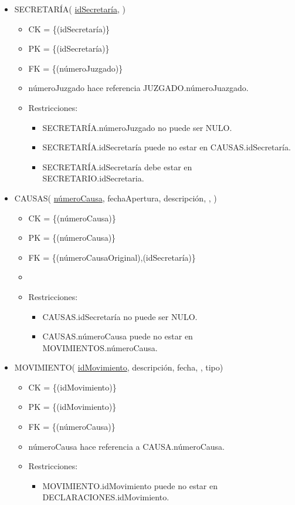 \begin{itemize}
\item SECRETARÍA( \underline{idSecretaría}, )
	\begin{itemize}
		\item CK = \{(idSecretaría)\}
		\item PK = \{(idSecretaría)\}
		\item FK = \{(númeroJuzgado)\}
		\item númeroJuzgado hace referencia JUZGADO.númeroJuazgado.
		\item Restricciones:
			\begin{itemize}
			\item SECRETARÍA.númeroJuzgado no puede ser NULO.
			\item SECRETARÍA.idSecretaría puede no estar en CAUSAS.idSecretaría.
			\item SECRETARÍA.idSecretaría debe estar en SECRETARIO.idSecretaria.
			\\
			\end{itemize}
	\end{itemize}

	
\item CAUSAS( \underline{númeroCausa}, fechaApertura, descripción, , )
	\begin{itemize}
		\item CK = \{(númeroCausa)\}
		\item PK = \{(númeroCausa)\}
		\item FK = \{(númeroCausaOriginal),(idSecretaría)\}
		\item 
		\item Restricciones:
			\begin{itemize}
			\item CAUSAS.idSecretaría no puede ser NULO.
			\item CAUSAS.númeroCausa puede no estar en MOVIMIENTOS.númeroCausa.
			\\
			\end{itemize}
	\end{itemize}

	
\item MOVIMIENTO( \underline{idMovimiento}, descripción, fecha, , tipo)
	\begin{itemize}
		\item CK = \{(idMovimiento)\}
		\item PK = \{(idMovimiento)\}
		\item FK = \{(númeroCausa)\}
		\item númeroCausa hace referencia a CAUSA.númeroCausa.
		\item Restricciones:
			\begin{itemize}
			\item MOVIMIENTO.idMovimiento puede no estar en DECLARACIONES.idMovimiento.
			\\
			\end{itemize}
	\end{itemize} 
	

\end{itemize}
